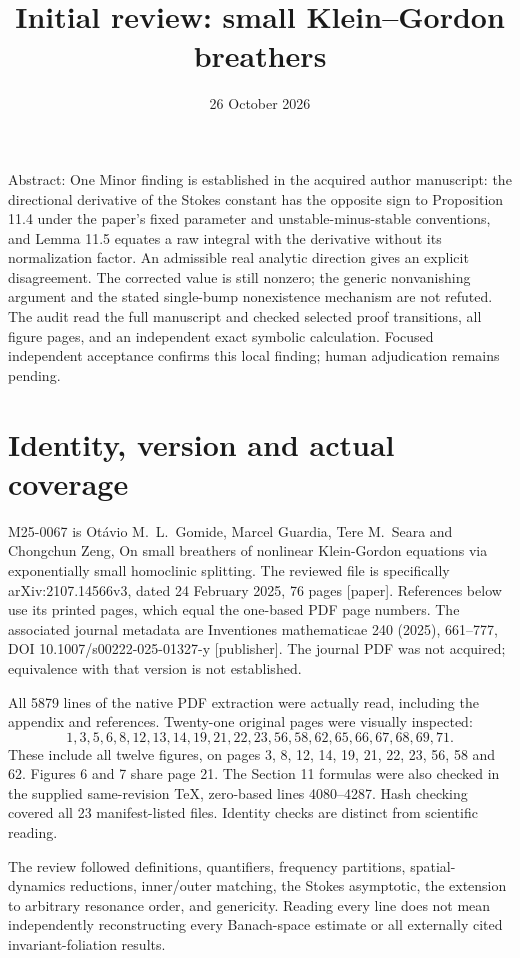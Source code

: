 \documentclass[10pt]{article}
\title{Initial review: small Klein–Gordon breathers}
\author{}
\date{26 October 2026}
\begin{document}
\maketitle
Abstract: One Minor finding is established in the acquired author manuscript: the directional derivative of the Stokes constant has the opposite sign to Proposition 11.4 under the paper’s fixed parameter and unstable-minus-stable conventions, and Lemma 11.5 equates a raw integral with the derivative without its normalization factor. An admissible real analytic direction gives an explicit disagreement. The corrected value is still nonzero; the generic nonvanishing argument and the stated single-bump nonexistence mechanism are not refuted. The audit read the full manuscript and checked selected proof transitions, all figure pages, and an independent exact symbolic calculation. Focused independent acceptance confirms this local finding; human adjudication remains pending.\par
\section*{Identity, version and actual coverage}
M25-0067 is Otávio M. L. Gomide, Marcel Guardia, Tere M. Seara and Chongchun Zeng, On small breathers of nonlinear Klein-Gordon equations via exponentially small homoclinic splitting. The reviewed file is specifically arXiv:2107.14566v3, dated 24 February 2025, 76 pages [paper]. References below use its printed pages, which equal the one-based PDF page numbers. The associated journal metadata are Inventiones mathematicae 240 (2025), 661–777, DOI 10.1007/s00222-025-01327-y [publisher]. The journal PDF was not acquired; equivalence with that version is not established.\par
All 5879 lines of the native PDF extraction were actually read, including the appendix and references. Twenty-one original pages were visually inspected: \[1,3,5,6,8,12,13,14,19,21,22,23,56,58,62,65,66,67,68,69,71.\] These include all twelve figures, on pages 3, 8, 12, 14, 19, 21, 22, 23, 56, 58 and 62. Figures 6 and 7 share page 21. The Section 11 formulas were also checked in the supplied same-revision TeX, zero-based lines 4080–4287. Hash checking covered all 23 manifest-listed files. Identity checks are distinct from scientific reading.\par
The review followed definitions, quantifiers, frequency partitions, spatial-dynamics reductions, inner/outer matching, the Stokes asymptotic, the extension to arbitrary resonance order, and genericity. Reading every line does not mean independently reconstructing every Banach-space estimate or all externally cited invariant-foliation results.\par
\end{document}

